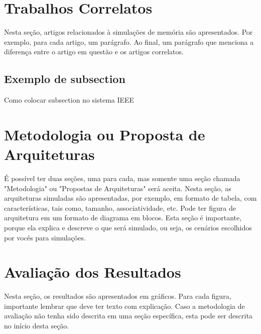 \documentclass[conference]{IEEEtran}
\begin{document}
\section{Trabalhos Correlatos}

Nesta seção, artigos relacionados à simulações de memória são apresentados.
Por exemplo, para cada artigo, um parágrafo. Ao final, um parágrafo que menciona
a diferença entre o artigo em questão e os artigos correlatos.

\subsection{Exemplo de subsection}

Como colocar subsection no sistema IEEE

\section{Metodologia ou Proposta de Arquiteturas}

É possível ter duas seções, uma para cada, mas somente uma seção chamada 
"Metodologia" ou "Propostas de Arquiteturas" será aceita. Nesta seção, as 
arquiteturas simuladas são apresentadas, por exemplo, em formato de tabela, 
com características, tais como, tamanho, associatividade, etc.  Pode ter figura
de arquitetura em um formato de diagrama em blocos. Esta seção é importante, 
porque ela explica e descreve o que será simulado, ou seja, os cenários escolhidos 
por vocês para simulações.

\section{Avaliação dos Resultados}

Nesta seção, os resultados são apresentados em gráficos. Para cada figura,
importante lembrar que deve ter texto com explicação.
Caso a metodologia de avaliação não tenha sido descrita em uma seção específica,
esta pode ser descrita no início desta seção.

\begin{figure}[!ht]

  \centering


\end{figure}
\end{document}
